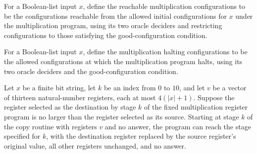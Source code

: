 \begin{definition}
\label{Complexity.MultReach}
\leanok
{}
For a Boolean-list input $x$, define the reachable multiplication configurations to be
the configurations reachable from the allowed initial configurations for $x$ under the
multiplication program, using its two oracle deciders and restricting configurations to
those satisfying the good-configuration condition.
\end{definition}

\begin{definition}
\label{Complexity.MultHalt}
\leanok
{}
For a Boolean-list input $x$, define the multiplication halting configurations to be the
allowed configurations at which the multiplication program halts, using its two oracle
deciders and the good-configuration condition.
\end{definition}

\begin{lemma}
\label{Complexity.mult_copy}
\leanok
{}
Let $x$ be a finite bit string, let $k$ be an index from $0$ to $10$, and let $v$ be a
vector of thirteen natural-number registers, each at most $4(|x|+1)$. Suppose the
register selected as the destination by stage $k$ of the fixed multiplication register
program is no larger than the register selected as its source. Starting at stage $k$ of
the copy routine with registers $v$ and no answer, the program can reach the stage
specified for $k$, with the destination register replaced by the source register's
original value, all other registers unchanged, and no answer.
\end{lemma}

